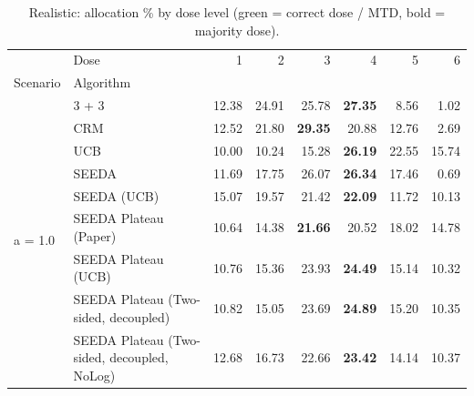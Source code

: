 \begin{table}[H]
\centering
\caption{Realistic: allocation \% by dose level (green = correct dose / MTD, bold = majority dose).}
\label{tab:real_alloc_by_dose}
\begin{tabular}{llrrrrrr}
\toprule
 & Dose & 1 & 2 & 3 & 4 & 5 & 6 \\
Scenario & Algorithm &  &  &  &  &  &  \\
\midrule
\multirow[c]{9}{*}{a = 1.0} & 3 + 3 & 12.38 & 24.91 & {\cellcolor[HTML]{C8E6C9}} 25.78 & \bfseries 27.35 & 8.56 & 1.02 \\
 & CRM & 12.52 & 21.80 & {\cellcolor[HTML]{C8E6C9}} \bfseries 29.35 & 20.88 & 12.76 & 2.69 \\
 & UCB & 10.00 & 10.24 & {\cellcolor[HTML]{C8E6C9}} 15.28 & \bfseries 26.19 & 22.55 & 15.74 \\
 & SEEDA & 11.69 & 17.75 & {\cellcolor[HTML]{C8E6C9}} 26.07 & \bfseries 26.34 & 17.46 & 0.69 \\
 & SEEDA (UCB) & 15.07 & 19.57 & {\cellcolor[HTML]{C8E6C9}} 21.42 & \bfseries 22.09 & 11.72 & 10.13 \\
 & SEEDA Plateau (Paper) & 10.64 & 14.38 & {\cellcolor[HTML]{C8E6C9}} \bfseries 21.66 & 20.52 & 18.02 & 14.78 \\
 & SEEDA Plateau (UCB) & 10.76 & 15.36 & {\cellcolor[HTML]{C8E6C9}} 23.93 & \bfseries 24.49 & 15.14 & 10.32 \\
 & SEEDA Plateau (Two-sided, decoupled) & 10.82 & 15.05 & {\cellcolor[HTML]{C8E6C9}} 23.69 & \bfseries 24.89 & 15.20 & 10.35 \\
 & SEEDA Plateau (Two-sided, decoupled, NoLog) & 12.68 & 16.73 & {\cellcolor[HTML]{C8E6C9}} 22.66 & \bfseries 23.42 & 14.14 & 10.37 \\
\bottomrule
\end{tabular}
\end{table}
